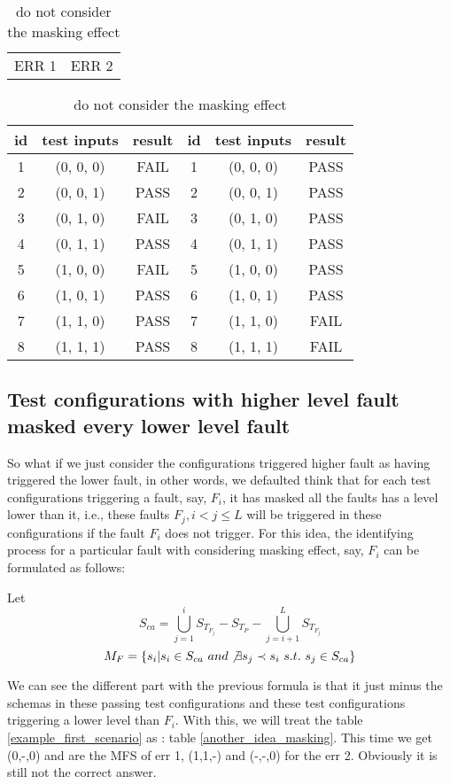 \documentclass{sig-alternate}
\begin{document}
\begin{table}
\centering
\caption{do not consider the masking effect}
\label{simple_idea}
\begin{tabular}{p{}|p{}} \hline
   ERR 1 & ERR 2
\end{tabular}

\begin{tabular}{c|c|c|c|c|c} \hline
id &test inputs & result & id&test inputs & result\\ \hline
1 &(0, 0, 0) &  FAIL &1&(0, 0, 0) &  PASS\\ \hline
2 &(0, 0, 1) &  PASS &2&(0, 0, 1) &  PASS\\ \hline
3 &(0, 1, 0) &  FAIL &3&(0, 1, 0) &  PASS\\ \hline
4 &(0, 1, 1) &  PASS &4&(0, 1, 1) &  PASS\\ \hline
5 &(1, 0, 0) &  FAIL &5&(1, 0, 0) &  PASS\\ \hline
6 &(1, 0, 1) &  PASS &6&(1, 0, 1) &  PASS\\ \hline
7 &(1, 1, 0) &  PASS &7&(1, 1, 0) &  FAIL\\ \hline
8 &(1, 1, 1) &  PASS &8&(1, 1, 1) &  FAIL\\ \hline
\hline\end{tabular}
\end{table}


\subsection{Test configurations with higher level fault masked every lower level fault}

So what if we just consider the configurations triggered higher fault as having triggered the lower fault, in other words, we defaulted think that for each test configurations triggering a fault, say, $F_{i}$, it has masked all the faults has a level lower than it, i.e., these faults $F_{j}, i < j \leq L $ will be triggered in these configurations if the fault $F_{i}$ does not trigger. For this idea, the identifying process for a particular fault with considering masking effect, say, $F_{i}$ can be formulated as follows:

Let $$S_{ca} =\bigcup_{j = 1}^{i}S_{T_{F_{j}}} - S_{T_{P}} - \bigcup_{j = i+1}^{L}S_{T_{F_{j}}}$$
$$M_{F} = \{s_{i} | s_{i} \in S_{ca}\ and \not\exists s_{j} \prec s_{i}\ s.t.\ s_{j} \in S_{ca} \}$$

We can see the different part with the previous formula is that it just minus the schemas in these passing test configurations and these test configurations triggering a lower level than $F_{i}$. With this, we will treat the table \ref{example_first_scenario} as : table \ref{another_idea_masking}.  This time we get  (0,-,0) and  are the MFS of err 1, (1,1,-) and (-,-,0) for the err 2. Obviously it is still not the correct answer.
\end{document}
